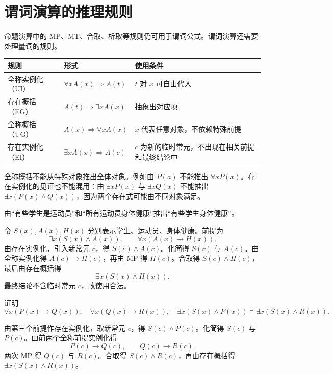 \section{谓词演算的推理规则}

命题演算中的 MP、MT、合取、析取等规则仍可用于谓词公式。谓词演算还需要处理量词的规则。

\begin{center}\small
\begin{tabularx}{\textwidth}{lXX}
\toprule
规则 & 形式 & 使用条件\\
\midrule
全称实例化（UI） & $\forall xA(x)\Rightarrow A(t)$ & $t$ 对 $x$ 可自由代入\\
存在概括（EG） & $A(t)\Rightarrow\exists xA(x)$ & 抽象出对应项\\
全称概括（UG） & $A(x)\Rightarrow\forall xA(x)$ & $x$ 代表任意对象，不依赖特殊前提\\
存在实例化（EI） & $\exists xA(x)\Rightarrow A(c)$ & $c$ 为新的临时常元，不出现在相关前提和最终结论中\\
\bottomrule
\end{tabularx}
\end{center}

全称概括不能从特殊对象推出全体对象。例如由 $P(a)$ 不能推出 $\forall xP(x)$。存在实例化的见证也不能混用：由 $\exists xP(x)$ 与 $\exists xQ(x)$ 不能推出 $\exists x(P(x)\land Q(x))$，因为两个存在式可能由不同对象满足。

\begin{example}[title={存在三段论}]\label{ch2-existential-proof}
由“有些学生是运动员”和“所有运动员身体健康”推出“有些学生身体健康”。
\begin{solution}
令 $S(x),A(x),H(x)$ 分别表示学生、运动员、身体健康。前提为
\[
\exists x(S(x)\land A(x)),\qquad \forall x(A(x)\to H(x)).
\]
由存在实例化，引入新常元 $c$，得 $S(c)\land A(c)$。化简得 $S(c)$ 与 $A(c)$。由全称实例化得 $A(c)\to H(c)$，再由 MP 得 $H(c)$。合取得 $S(c)\land H(c)$，最后由存在概括得
\[
\exists x(S(x)\land H(x)).
\]
最终结论不含临时常元 $c$，故使用合法。
\end{solution}
\end{example}

\begin{example}[title={链式谓词推理}]\label{ch2-chain-proof}
证明
\[
\forall x(P(x)\to Q(x)),\quad
\forall x(Q(x)\to R(x)),\quad
\exists x(S(x)\land P(x))
\vDash \exists x(S(x)\land R(x)).
\]
\begin{solution}
由第三个前提作存在实例化，取新常元 $c$，得 $S(c)\land P(c)$。化简得 $S(c)$ 与 $P(c)$。由前两个全称前提实例化得
\[
P(c)\to Q(c),\qquad Q(c)\to R(c).
\]
两次 MP 得 $Q(c)$ 与 $R(c)$。合取得 $S(c)\land R(c)$，再由存在概括得 $\exists x(S(x)\land R(x))$。
\end{solution}
\end{example}

